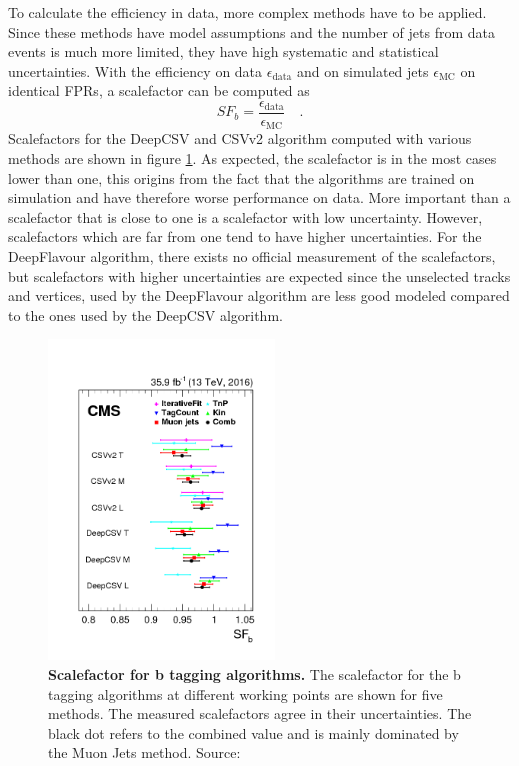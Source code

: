 To calculate the efficiency in data, more complex methods have to be applied. Since these methods have model assumptions and the number of jets from data events is much more limited, they have high systematic and statistical uncertainties. With the efficiency on data $\epsilon_\textrm{data}$ and on simulated jets $\epsilon_\textrm{MC}$ on identical FPRs, a scalefactor can be computed as
\begin{equation}
SF_b = \frac{\epsilon_\textrm{data}}{\epsilon_\textrm{MC}} \quad .
\end{equation}
Scalefactors for the DeepCSV and CSVv2 algorithm computed with various methods are shown in figure \ref{fig:ch_5_Scalefactor}. As expected, the scalefactor is in the most cases lower than one, this origins from the fact that the algorithms are trained on simulation and have therefore worse performance on data. More important than a scalefactor that is close to one is a scalefactor with low uncertainty. However, scalefactors which are far from one tend to have higher uncertainties. For the DeepFlavour algorithm, there exists no official measurement of the scalefactors, but scalefactors with higher uncertainties are expected since the unselected tracks and vertices, used by the DeepFlavour algorithm are less good modeled compared to the ones used by the DeepCSV algorithm.

\begin{figure}
\centering
\includegraphics[width=6cm]{chapter_5_tagging/SF.png}
\caption[Scalefactors for b Tagging Algorithms]{\textbf{Scalefactor for b tagging algorithms.} The scalefactor for the b tagging algorithms at different working points are shown for five methods. The measured scalefactors agree in their uncertainties. The black dot refers to the combined value and is mainly dominated by the Muon Jets method. Source: \cite{HeavyFlavorIdentification}}
\label{fig:ch_5_Scalefactor}
\end{figure}